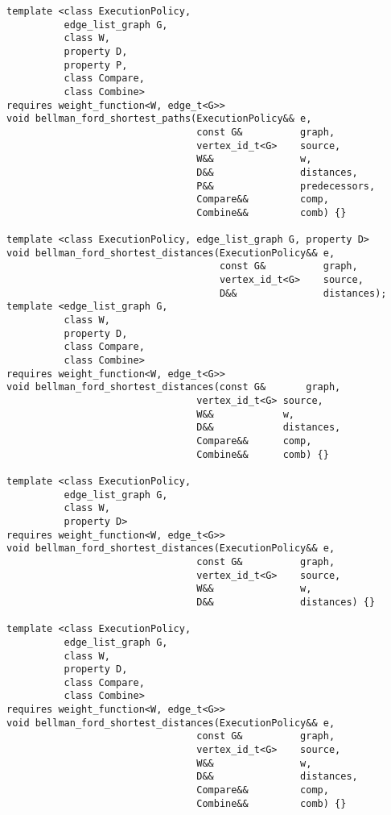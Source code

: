 \begin{lstlisting}
template <class ExecutionPolicy,
          edge_list_graph G,
          class W,
          property D,
          property P,
          class Compare,
          class Combine>
requires weight_function<W, edge_t<G>>
void bellman_ford_shortest_paths(ExecutionPolicy&& e,
                                 const G&          graph,
                                 vertex_id_t<G>    source,
                                 W&&               w,
                                 D&&               distances,
                                 P&&               predecessors,
                                 Compare&&         comp,
                                 Combine&&         comb) {}

template <class ExecutionPolicy, edge_list_graph G, property D>
void bellman_ford_shortest_distances(ExecutionPolicy&& e,
                                     const G&          graph,
                                     vertex_id_t<G>    source,
                                     D&&               distances);
template <edge_list_graph G,
          class W,
          property D,
          class Compare,
          class Combine>
requires weight_function<W, edge_t<G>>
void bellman_ford_shortest_distances(const G&       graph,
                                 vertex_id_t<G> source,
                                 W&&            w,
                                 D&&            distances,
                                 Compare&&      comp,
                                 Combine&&      comb) {}

template <class ExecutionPolicy,
          edge_list_graph G,
          class W,
          property D>
requires weight_function<W, edge_t<G>>
void bellman_ford_shortest_distances(ExecutionPolicy&& e,
                                 const G&          graph,
                                 vertex_id_t<G>    source,
                                 W&&               w,
                                 D&&               distances) {}

template <class ExecutionPolicy,
          edge_list_graph G,
          class W,
          property D,
          class Compare,
          class Combine>
requires weight_function<W, edge_t<G>>
void bellman_ford_shortest_distances(ExecutionPolicy&& e,
                                 const G&          graph,
                                 vertex_id_t<G>    source,
                                 W&&               w,
                                 D&&               distances,
                                 Compare&&         comp,
                                 Combine&&         comb) {}



\end{lstlisting}
